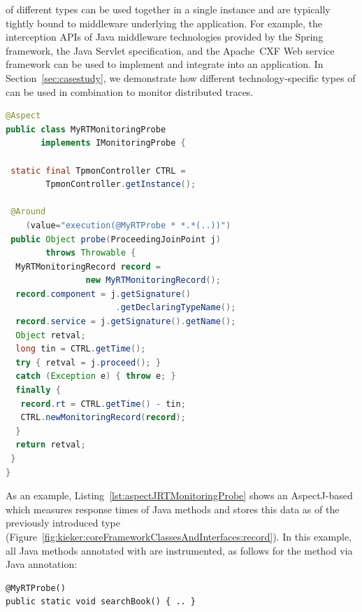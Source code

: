 \MonitoringProbes{} of different types can be used together in a single \KiekerTpmon{} %
instance and are typically tightly bound to middleware underlying the application. %
For example, the interception APIs of Java middleware technologies provided by the
Spring framework, the Java Servlet specification, and the Apache~CXF Web service
framework can be used to implement and integrate \MonitoringProbes{} into an application. %
In Section~\ref{sec:casestudy}, we demonstrate how different technology-specific
types of \MonitoringProbes{} can be used in combination to monitor distributed traces.

\begin{lstlisting}[float, language=Java, caption=Example AspectJ response time Monitoring Probe, label=lst:aspectJRTMonitoringProbe]
@Aspect
public class MyRTMonitoringProbe
       implements IMonitoringProbe {

 static final TpmonController CTRL =
        TpmonController.getInstance();

 @Around
    (value="execution(@MyRTProbe * *.*(..))")
 public Object probe(ProceedingJoinPoint j)
        throws Throwable {
  MyRTMonitoringRecord record =
                new MyRTMonitoringRecord();
  record.component = j.getSignature()
                      .getDeclaringTypeName();
  record.service = j.getSignature().getName();
  Object retval;
  long tin = CTRL.getTime();
  try { retval = j.proceed(); }
  catch (Exception e) { throw e; }
  finally {
   record.rt = CTRL.getTime() - tin;
   CTRL.newMonitoringRecord(record);
  }
  return retval;
 }
}
\end{lstlisting}

As an example, Listing~\ref{lst:aspectJRTMonitoringProbe} shows an AspectJ-based \MonitoringProbe{} %
which measures response times of Java methods and stores this data as \MonitoringRecords{} %
of the previously introduced type  (Figure~\ref{fig:kieker:coreFrameworkClassesAndInterfaces:record}). %
In this example, all Java methods annotated with  %
are instrumented, as follows for the method  via Java annotation:\\

\begin{minipage}{\columnwidth}
{\small
\begin{verbatim}
@MyRTProbe()
public static void searchBook() { .. }
\end{verbatim}
}
\end{minipage}\\

